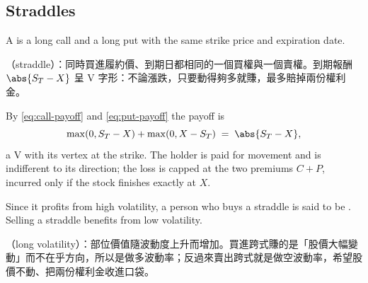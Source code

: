 \subsection{Straddles}


\begin{definition}
	A  is a long call and a long put with the same strike price and expiration date.
\end{definition}

\suppstart
\begin{remark}
	（straddle）：同時買進履約價、到期日都相同的一個買權與一個賣權。到期報酬 $\abs{S_{T}-X}$ 呈 V 字形：不論漲跌，只要動得夠多就賺，最多賠掉兩份權利金。
\end{remark}

By \eqref{eq:call-payoff} and \eqref{eq:put-payoff} the payoff is
\begin{equation}
	\max(0,S_{T}-X)+\max(0,X-S_{T}) \;=\; \abs{S_{T}-X} ,
	\label{eq:straddle-payoff}
\end{equation}
a V with its vertex at the strike.
The holder is paid for movement and is indifferent to its direction; the loss is capped at the two premiums $C+P$, incurred only if the stock finishes exactly at $X$.
\suppend

Since it profits from high volatility, a person who buys a straddle is said to be .
Selling a straddle benefits from low volatility.
\suppstart
\begin{remark}
	（long volatility）：部位價值隨波動度上升而增加。買進跨式賺的是「股價大幅變動」而不在乎方向，所以是做多波動率；反過來賣出跨式就是做空波動率，希望股價不動、把兩份權利金收進口袋。
\end{remark}
\suppend

